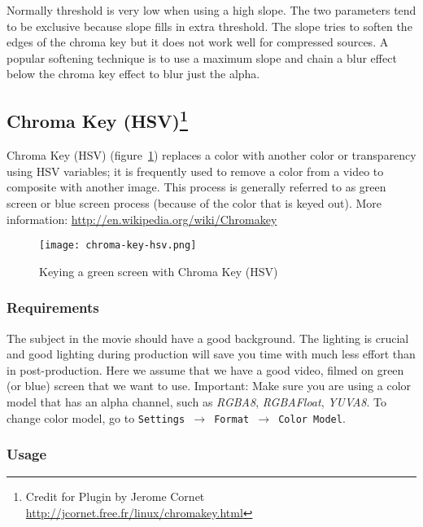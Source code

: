 Normally threshold is very low when using a high slope. The two parameters tend to be exclusive because slope fills in extra threshold. The slope tries to soften the edges of the chroma key but it does not work well for compressed sources. A popular softening technique is to use a maximum slope and chain a blur effect below the chroma key effect to blur just the alpha.

\subsection[Chroma Key (HSV)]{Chroma Key (HSV)\protect\footnote{Credit for Plugin by Jerome Cornet \url{http://jcornet.free.fr/linux/chromakey.html}}}%
\label{sub:chroma_key_hsv}

Chroma Key (HSV) (figure~\ref{fig:chroma-key-hsv}) replaces a color with another color or transparency using HSV variables; it is frequently used to remove a color from a video to composite with another image. This process is generally referred to as green screen or blue screen process (because of the color that is keyed out). More information: {\small \url{http://en.wikipedia.org/wiki/Chromakey}}

\begin{figure}[htpb]
    \centering
    \texttt{[image: chroma-key-hsv.png]}
    \caption{Keying a green screen with Chroma Key (HSV)}
    \label{fig:chroma-key-hsv}
\end{figure}

\subsubsection*{Requirements}
\label{ssub:requirements}

The subject in the movie should have a good background. The lighting is crucial and good lighting during production will save you time with much less effort than in post-production.
Here we assume that we have a good video, filmed on green (or blue) screen that we want to use. Important: Make sure you are using a color model that has an alpha channel, such as \textit{RGBA8}, \textit{RGBAFloat}, \textit{YUVA8}. To change color model, go to \texttt{Settings $\rightarrow$ Format $\rightarrow$ Color Model}.

\subsubsection*{Usage}
\label{ssub:usage}

